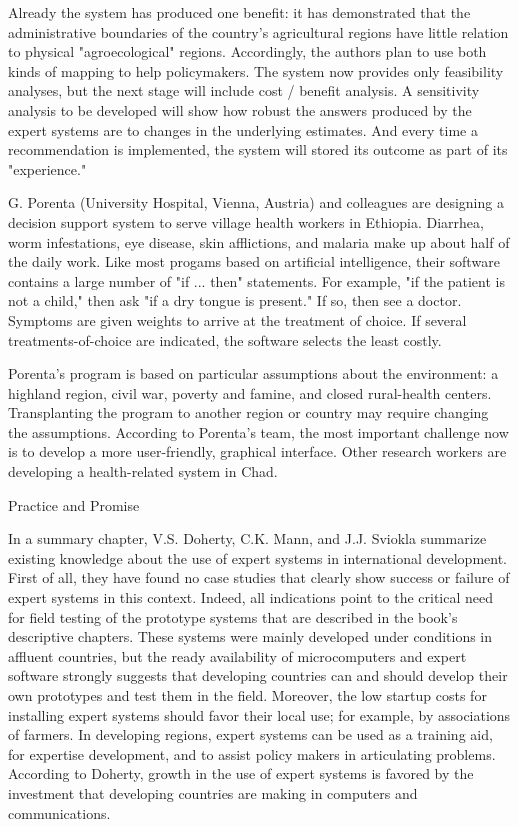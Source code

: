 Already the system has produced one benefit: it has demonstrated that
the administrative boundaries of the country's agricultural regions have
little relation to physical "agroecological" regions. Accordingly, the
authors plan to use both kinds of mapping to help policymakers. The
system now provides only feasibility analyses, but the next stage will
include cost / benefit analysis. A sensitivity analysis to be developed
will show how robust the answers produced by the expert systems are to
changes in the underlying estimates. And every time a recommendation is
implemented, the system will stored its outcome as part of its
"experience."

G. Porenta (University Hospital, Vienna, Austria) and colleagues are
designing a decision support system to serve village health workers in
Ethiopia. Diarrhea, worm infestations, eye disease, skin afflictions,
and malaria make up about half of the daily work. Like most progams
based on artificial intelligence, their software contains a large number
of "if ... then" statements. For example, "if the patient is not a
child," then ask "if a dry tongue is present." If so, then see a doctor.
Symptoms are given weights to arrive at the treatment of choice. If
several treatments-of-choice are indicated, the software selects the
least costly.

Porenta's program is based on particular assumptions about the
environment: a highland region, civil war, poverty and famine, and closed 
rural-health centers. Transplanting the program to another region or
country may require changing the assumptions. According to Porenta's
team, the most important challenge now is to develop a more
user-friendly, graphical interface. Other research workers are developing a 
health-related system in Chad.

Practice and Promise

In a summary chapter, V.S. Doherty, C.K. Mann, and J.J. Sviokla
summarize existing knowledge about the use of expert systems in international 
development. First of all, they have found no case studies that clearly
show success or failure of expert systems in this context. Indeed, all
indications point to the critical need for field testing of the
prototype systems that are described in the book's descriptive chapters. 
These systems were mainly developed under conditions in affluent
countries, but the ready availability of microcomputers and expert software 
strongly suggests that developing countries can and should develop their
own prototypes and test them in the field. Moreover, the low startup
costs for installing expert systems should favor their local use; for
example, by associations of farmers. In developing regions, expert
systems can be used as a training aid, for expertise development, and to 
assist policy makers in articulating problems. According to Doherty,
growth in the use of expert systems is favored by the investment that
developing countries are making in computers and communications.

